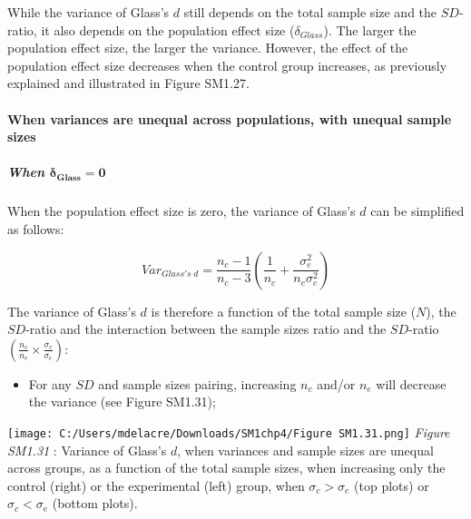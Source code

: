 \documentclass[
  english,
  man,mask,floatsintext]{apa6}
\providecommand{\tightlist}{%
  \setlength{\itemsep}{0pt}\setlength{\parskip}{0pt}}
\let\oldparagraph\paragraph
\renewcommand{\paragraph}[1]{\oldparagraph{#1}\mbox{}}
\let\oldsubparagraph\subparagraph
\renewcommand{\subparagraph}[1]{\oldsubparagraph{#1}\mbox{}}
\begin{document}
While the variance of Glass's \(d\) still depends on the total sample size and the \(SD\)-ratio, it also depends on the population effect size (\(\delta_{Glass}\)). The larger the population effect size, the larger the variance. However, the effect of the population effect size decreases when the control group increases, as previously explained and illustrated in Figure SM1.27.

\hypertarget{when-variances-are-unequal-across-populations-with-unequal-sample-sizes-2}{%
\paragraph{When variances are unequal across populations, with unequal sample sizes}\label{when-variances-are-unequal-across-populations-with-unequal-sample-sizes-2}}

\hypertarget{when-bmdelta_glass-0-1}{%
\subparagraph{\texorpdfstring{When \(\bm{\delta_{Glass} = 0}\)}{When \textbackslash bm\{\textbackslash delta\_\{Glass\} = 0\}}}\label{when-bmdelta_glass-0-1}}

When the population effect size is zero, the variance of Glass's \(d\) can be simplified as follows:

\[Var_{Glass's \; d} = \frac{n_c-1}{n_c-3} \left( \frac{1}{n_c}+\frac{\sigma^2_e}{n_e\sigma^2_c}\right)\]

The variance of Glass's \(d\) is therefore a function of the total sample size (\(N\)), the \(SD\)-ratio and the interaction between the sample sizes ratio and the \(SD\)-ratio \(\left(\frac{n_c}{n_e}\times\frac{\sigma_c}{\sigma_e} \right)\):

\begin{itemize}
\tightlist
\item
  For any \(SD\) and sample sizes pairing, increasing \(n_c\) and/or \(n_e\) will decrease the variance (see Figure SM1.31);
\end{itemize}

\texttt{[image: C:/Users/mdelacre/Downloads/SM1chp4/Figure SM1.31.png]}
\emph{Figure SM1.31} : Variance of Glass's \(d\), when variances and sample sizes are unequal across groups, as a function of the total sample sizes, when increasing only the control (right) or the experimental (left) group, when \(\sigma_c > \sigma_e\) (top plots) or \(\sigma_c < \sigma_e\) (bottom plots).
\end{document}

